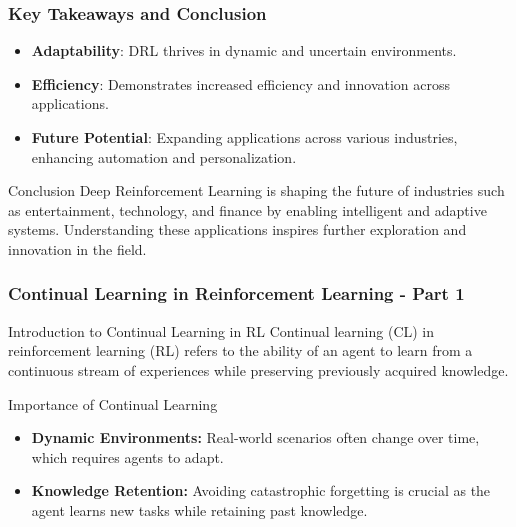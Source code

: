 \documentclass[aspectratio=169]{beamer}
\begin{document}
\begin{frame}[fragile]
    \frametitle{Key Takeaways and Conclusion}
    \begin{itemize}
        \item \textbf{Adaptability}: DRL thrives in dynamic and uncertain environments.
        \item \textbf{Efficiency}: Demonstrates increased efficiency and innovation across applications.
        \item \textbf{Future Potential}: Expanding applications across various industries, enhancing automation and personalization.
    \end{itemize}
    
    \begin{block}{Conclusion}
        Deep Reinforcement Learning is shaping the future of industries such as entertainment, technology, and finance by enabling intelligent and adaptive systems. Understanding these applications inspires further exploration and innovation in the field.
    \end{block}
\end{frame}

\begin{frame}[fragile]
    \frametitle{Continual Learning in Reinforcement Learning - Part 1}
    \begin{block}{Introduction to Continual Learning in RL}
        Continual learning (CL) in reinforcement learning (RL) refers to the ability of an agent to learn from a continuous stream of experiences while preserving previously acquired knowledge.
    \end{block}
    
    \begin{block}{Importance of Continual Learning}
        \begin{itemize}
            \item \textbf{Dynamic Environments:} Real-world scenarios often change over time, which requires agents to adapt.
            \item \textbf{Knowledge Retention:} Avoiding catastrophic forgetting is crucial as the agent learns new tasks while retaining past knowledge.
        \end{itemize}
    \end{block}
\end{frame}
\end{document}
